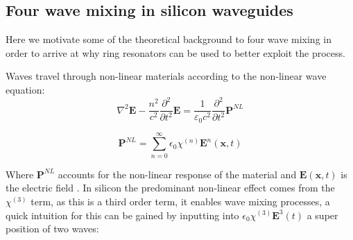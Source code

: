 
\subsection{Four wave mixing in silicon waveguides}
Here we motivate some of the theoretical background to four wave mixing in order to arrive at why ring resonators can be used to better exploit the process. 

Waves travel through non-linear materials according to the non-linear wave equation:
\begin{equation}
\nabla^2 \mathbf{E} - \frac{n^2}{c^2}\frac{\partial^2}{\partial t^2}\mathbf{E}
= \frac{1}{\varepsilon_0 c^2}\frac{\partial^2}{\partial t^2}\mathbf{P}^{NL}
\end{equation}

\begin{equation} \label{polEqn}
\mathbf{P}^{NL} =\sum^\infty_{n=0} \epsilon_0\chi^{(n)}\mathbf{E}^n(\mathbf{x	},t)
\end{equation}

Where $\mathbf{P}^{NL}$ accounts for the non-linear response of the material and $\mathbf{E}(\mathbf{x},t)$ is the electric field . In silicon the predominant non-linear effect comes from the $\chi^{(3)}$ term, as this is a third order term, it enables wave mixing processes, a quick intuition for this can be gained by inputting into $ \epsilon_0\chi^{(3)}\mathbf{E}^3(t)$ a super position of two waves:



